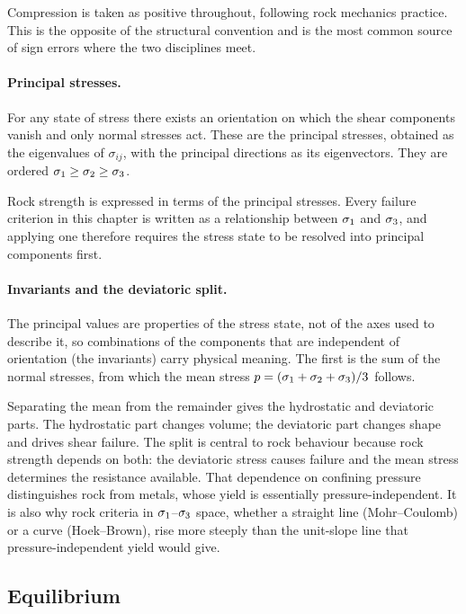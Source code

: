 Compression is taken as positive throughout, following rock mechanics
practice. This is the opposite of the structural convention and is the
most common source of sign errors where the two disciplines meet.

\paragraph{Principal stresses.}
For any state of stress there exists an orientation on which the shear
components vanish and only normal stresses act. These are the principal
stresses, obtained as the eigenvalues of $\sigma_{ij}$, with the principal
directions as its eigenvectors. They are ordered
$\sigma_1 \geq \sigma_2 \geq \sigma_3$.

Rock strength is expressed in terms of the principal stresses.
Every failure criterion in this chapter is written as a relationship between
$\sigma_1$ and $\sigma_3$, and applying one therefore requires the stress state to
be resolved into principal components first.

\paragraph{Invariants and the deviatoric split.}
The principal values are properties of the stress state, not of the axes used
to describe it, so combinations of the components that are independent of
orientation (the invariants) carry physical meaning. The first is the
sum of the normal stresses, from which the mean stress
$p = (\sigma_1+\sigma_2+\sigma_3)/3$ follows.

Separating the mean from the remainder gives the hydrostatic and deviatoric
parts. The hydrostatic part changes volume; the deviatoric part changes shape
and drives shear failure. The split is central to rock behaviour because
rock strength depends on both: the deviatoric stress causes failure and the
mean stress determines the resistance available. That dependence on confining
pressure distinguishes rock from metals, whose yield is essentially
pressure-independent. It is also why rock criteria in
$\sigma_1$--$\sigma_3$ space, whether a straight line (Mohr--Coulomb) or a
curve (Hoek--Brown), rise more steeply than the unit-slope line that
pressure-independent yield would give.

\subsection{Equilibrium}
\label{sec:equilibrium}

